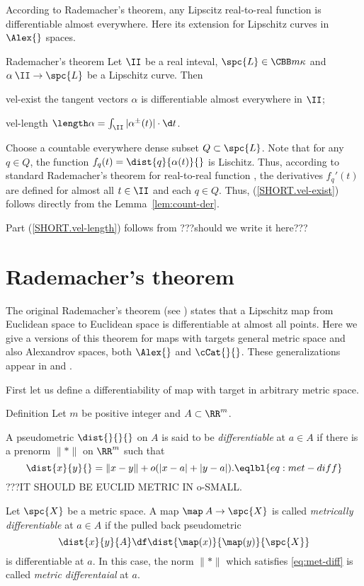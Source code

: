 According to Rademacher's theorem, any Lipscitz real-to-real function is differentiable almost everywhere. Here its extension for Lipschitz curves in $\Alex{}$ spaces.

\begin{thm}{Rademacher's theorem}\label{thm:velocity}
Let $\II$ be a real inteval, $\spc{L}\in\CBB m\kappa$
and $\alpha\:\II\to \spc{L}$ be a Lipschitz curve.
Then 

\begin{subthm}{vel-exist} the tangent vectors $\alpha$ is differentiable almost everywhere in $\II$;
\end{subthm}

\begin{subthm}{vel-length}
$\length\alpha=\int_{\II}|\alpha^\pm(t)|\cdot\d t$.
\end{subthm}

\end{thm}

Choose a countable everywhere dense subset $Q\subset \spc{L}$.
Note that for any $q\in Q$, the function $f_q(t)=\dist{q}{\alpha(t)}{}$ is Lischitz.
Thus, according to standard Rademacher's theorem for real-to-real function \cite[3.1.6]{federer}, the derivatives $f_q'(t)$ are defined for almost all $t\in\II$ and each $q\in Q$.
Thus, (\ref{SHORT.vel-exist}) follows directly from the Lemma~\ref{lem:count-der}.

Part (\ref{SHORT.vel-length}) follows from \cite[2.7.4]{BBI}
???should we write it here???
\qeds

\section{Rademacher's theorem}

The original Rademacher's theorem (see \cite[3.1.6]{federer})
states that a Lipschitz map from Euclidean space to Euclidean space is differentiable at almost all points.
Here we give a versions of this theorem for maps with targets
general metric space
and also Alexandrov spaces, both $\Alex{}$ and $\cCat{}{}$.
These generalizations appear in \cite{kirchheim} and \cite{lytchak:diff}.

First let us define a differentiability of map 
with target in arbitrary metric space.

\begin{thm}{Definition}
Let $m$ be positive integer and $A\subset \RR^m$.

A pseudometric $\dist{}{}{}$ on $A$ is said to be \emph{differentiable}
at $a\in A$ if there is a prenorm $\|{*}\|$ on $\RR^m$ such that
\[\dist{x}{y}{}=\|x-y\|+o(|x-a|+|y-a|).
\eqlbl{eq:met-diff}\]
???IT SHOULD BE EUCLID METRIC IN o-SMALL.

Let $\spc{X}$ be a metric space.
A map $\map\:A\to\spc{X}$ is called \emph{metrically differentiable} at $a\in A$ if the pulled back pseudometric 
\[\dist{x}{y}{A}
\df
\dist{\map(x)}{\map(y)}{\spc{X}}\]
is differentiable at $a$.
In this case, the norm $\|{*}\|$ which satisfies \ref{eq:met-diff} is called \emph{metric differentaial} at $a$.
\end{thm}

